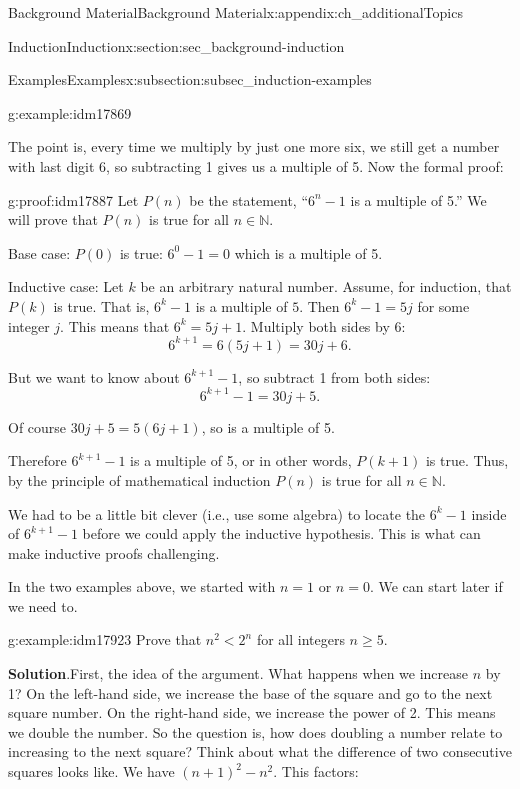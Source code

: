 \documentclass[oneside,10pt,]{book}
\numberwithin{equation}{chapter}
\def\N{\mathbb N}
\newcommand{\lt}{<}
\begin{document}
\begin{appendixptx}{Background Material}{}{Background Material}{}{}{x:appendix:ch_additionalTopics}
\begin{sectionptx}{Induction}{}{Induction}{}{}{x:section:sec_background-induction}
\begin{subsectionptx}{Examples}{}{Examples}{}{}{x:subsection:subsec_induction-examples}
\begin{example}{}{g:example:idm17869}
\par
The point is, every time we multiply by just one more six, we still get a number with last digit 6, so subtracting 1 gives us a multiple of 5. Now the formal proof:%
\begin{proofptx}{}{g:proof:idm17887}
Let \(P(n)\) be the statement, ``\(6^n - 1\) is a multiple of 5.'' We will prove that \(P(n)\) is true for all \(n \in \N\).%
\par
Base case: \(P(0)\) is true: \(6^0 -1 = 0\) which is a multiple of 5.%
\par
Inductive case: Let \(k\) be an arbitrary natural number. Assume, for induction, that \(P(k)\) is true. That is, \(6^k - 1\) is a multiple of \(5\). Then \(6^k - 1 = 5j\) for some integer \(j\). This means that \(6^k = 5j + 1\). Multiply both sides by \(6\):%
\begin{equation*}
6^{k+1} = 6(5j+1) = 30j + 6.
\end{equation*}
%
\par
But we want to know about \(6^{k+1} - 1\), so subtract 1 from both sides:%
\begin{equation*}
6^{k+1} - 1 = 30j + 5.
\end{equation*}
%
\par
Of course \(30j+5 = 5(6j+1)\), so is a multiple of 5.%
\par
Therefore \(6^{k+1} - 1\) is a multiple of 5, or in other words, \(P(k+1)\) is true. Thus, by the principle of mathematical induction \(P(n)\) is true for all \(n \in \N\).%
\end{proofptx}
\end{example}
We had to be a little bit clever (i.e., use some algebra) to locate the \(6^k - 1\) inside of \(6^{k+1} - 1\) before we could apply the inductive hypothesis. This is what can make inductive proofs challenging.%
\par
In the two examples above, we started with \(n = 1\) or \(n = 0\). We can start later if we need to.%
\begin{example}{}{g:example:idm17923}%
Prove that \(n^2 \lt  2^n\) for all integers \(n \ge 5\).%
\par\smallskip%
\noindent\textbf{Solution}.\hypertarget{g:solution:idm17928}{}\quad{}First, the idea of the argument. What happens when we increase \(n\) by 1? On the left-hand side, we increase the base of the square and go to the next square number. On the right-hand side, we increase the power of 2. This means we double the number. So the question is, how does doubling a number relate to increasing to the next square? Think about what the difference of two consecutive squares looks like. We have \((n+1)^2 - n^2\). This factors:%

\end{example}
\end{subsectionptx}
\end{sectionptx}
\end{appendixptx}
\end{document}

